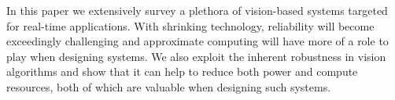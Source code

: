 In this paper we extensively survey a plethora of vision-based systems 
targeted for real-time applications. 
With shrinking technology, reliability will 
become exceedingly challenging and approximate computing will have more of a role to play when 
designing systems. We also exploit the inherent robustness 
in vision algorithms and show that it can help to reduce both 
power and compute resources, both of which are valuable when designing such systems. 
